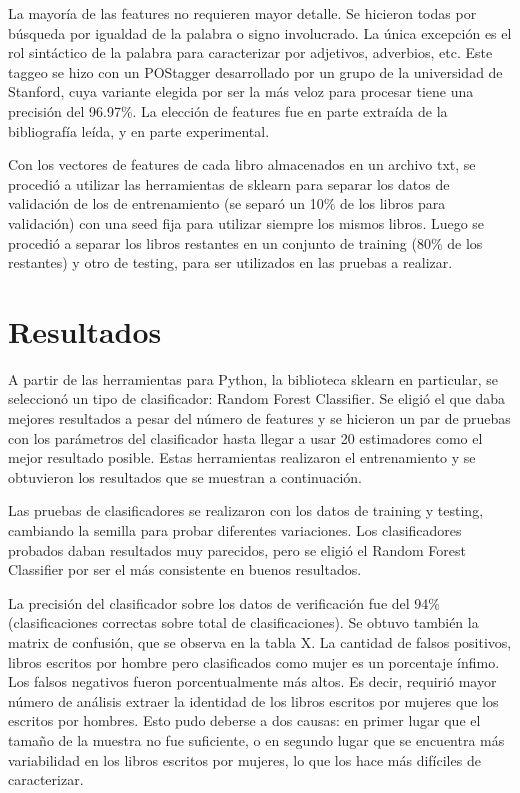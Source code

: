 \documentclass[
journal=jacsat, %
manuscript=article]{achemso}
\begin{document}
La mayoría de las features no requieren mayor detalle. Se hicieron todas por búsqueda por igualdad de la palabra o signo involucrado. La única excepción es el rol sintáctico de la palabra para caracterizar por adjetivos, adverbios, etc. Este taggeo se hizo con un POStagger desarrollado por un grupo de la universidad de Stanford, cuya variante elegida por ser la más veloz para procesar tiene una precisión del 96.97\%\cite{stanfordTagger}.
La elección de features fue en parte extraída de la bibliografía leída, y en parte experimental.

Con los vectores de features de cada libro almacenados en un archivo txt, se procedió a utilizar las herramientas de sklearn para separar los datos de validación de los de entrenamiento (se separó un 10\% de los libros para validación) con una seed fija para utilizar siempre los mismos libros. Luego se procedió a separar los libros restantes en un conjunto de training (80\% de los restantes) y otro de testing, para ser utilizados en las pruebas a realizar.

\section{Resultados}

A partir de las herramientas para Python, la biblioteca sklearn en particular, se seleccionó un tipo de clasificador: Random Forest Classifier. Se eligió el que daba mejores resultados a pesar del número de features y se hicieron un par de pruebas con los parámetros del clasificador hasta llegar a usar 20 estimadores como el mejor resultado posible. Estas herramientas realizaron el entrenamiento y se obtuvieron los resultados que se muestran a continuación.

Las pruebas de clasificadores se realizaron con los datos de training y testing, cambiando la semilla para probar diferentes variaciones. Los clasificadores probados daban resultados muy parecidos, pero se eligió el Random Forest Classifier por ser el más consistente en buenos resultados.

La precisión del clasificador sobre los datos de verificación fue del 94\% (clasificaciones correctas sobre total de clasificaciones). Se obtuvo también la matrix de confusión, que se observa en la tabla X. La cantidad de falsos positivos, libros escritos por hombre pero clasificados como mujer es un porcentaje ínfimo. Los falsos negativos fueron porcentualmente más altos. Es decir, requirió mayor número de análisis extraer la identidad de los libros escritos por mujeres que los escritos por hombres. Esto pudo deberse a dos causas: en primer lugar que el tamaño de la muestra no fue suficiente, o en segundo lugar que se encuentra más variabilidad en los libros escritos por mujeres, lo que los hace más difíciles de caracterizar.
\end{document}
